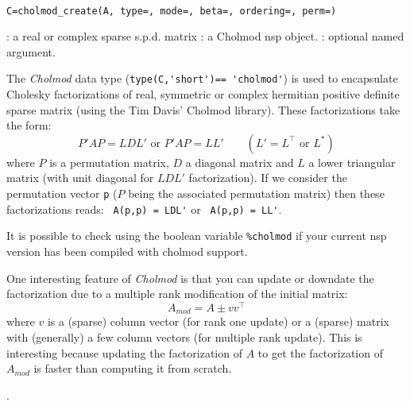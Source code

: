 
\begin{mandesc}
  \\
\end{mandesc}

\begin{calling_sequence}
\begin{verbatim}
C=cholmod_create(A, type=, mode=, beta=, ordering=, perm=)
\end{verbatim}
\end{calling_sequence}
\begin{parameters}
  \begin{varlist}
    : a real or complex sparse s.p.d. matrix
    : a Cholmod nsp object.
    : optional named argument. 
  \end{varlist}
\end{parameters}

\begin{mandescription}

The \emph{Cholmod} data type (\verb+type(C,'short')== 'cholmod'+) is used to 
encapsulate Cholesky factorizations of real, symmetric or complex hermitian 
positive definite sparse matrix (using the Tim Davis' Cholmod library). 
These factorizations take the form:
$$
P' A P = L D L' \mbox{ or } P' A P = L L' \qquad (L' = L^{\top} \mbox{ or } L^*)
$$
where $P$ is a permutation matrix, $D$ a diagonal matrix and $L$ a lower
triangular matrix (with unit diagonal for $LDL'$ factorization). If we consider
the permutation vector \verb+p+ ($P$ being the associated permutation matrix)
then these factorizations reads: \verb+ A(p,p) = LDL'+ or  \verb+ A(p,p) = LL'+. 

It is possible to check using the boolean variable \verb+%cholmod+ 
if your current nsp version has been compiled with cholmod support.
 
One interesting feature of \emph{Cholmod} is that you can update or downdate
the factorization due to a multiple rank modification of the initial matrix:
$$
  A_{mod} = A \pm v v^{\top}
$$
where $v$ is a (sparse) column vector (for rank one update) or a (sparse) matrix
with (generally) a few column vectors (for multiple rank update). This is interesting
because updating the factorization of $A$ to get the factorization of $A_{mod}$ is faster 
than computing it from scratch.
\end{mandescription}. 

